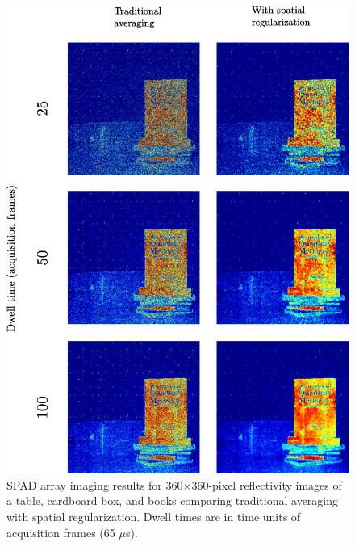 \begin{figure}[h!]
\centerline{\includegraphics[width=15cm]{figure-first-spad-boxbooks-i.pdf}}
\caption{SPAD array imaging results for 360$\times$360-pixel reflectivity images of a table, cardboard box, and books comparing traditional averaging with spatial regularization. Dwell times are in time units of acquisition frames (65 $\mu$s).}
\label{figure:first-spad-boxbooks-i}
\end{figure}

